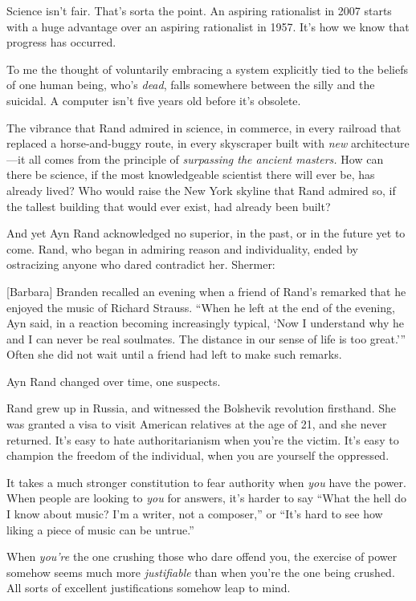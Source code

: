 {
 Science isn't fair. That's sorta
the point. An aspiring rationalist in 2007 starts with a huge advantage
over an aspiring rationalist in 1957. It's how we know
that progress has occurred.}

{
 To me the thought of voluntarily embracing a system explicitly
tied to the beliefs of one human being, who's
\textit{dead}, falls somewhere between the silly and the suicidal. A
computer isn't five years old before
it's obsolete.}

{
 The vibrance that Rand admired in science, in commerce, in every
railroad that replaced a horse-and-buggy route, in every skyscraper
built with \textit{new} architecture---it all comes from the principle
of \textit{surpassing the ancient masters.} How can there be science,
if the most knowledgeable scientist there will ever be, has already
lived? Who would raise the New York skyline that Rand admired so, if
the tallest building that would ever exist, had already been built?}

{
 And yet Ayn Rand acknowledged no superior, in the past, or in the
future yet to come. Rand, who began in admiring reason and
individuality, ended by ostracizing anyone who dared contradict her.
Shermer:}

{
 [Barbara] Branden recalled an evening when a friend of
Rand's remarked that he enjoyed the music of Richard
Strauss. ``When he left at the end of the evening, Ayn
said, in a reaction becoming increasingly typical, `Now
I understand why he and I can never be real soulmates. The distance in
our sense of life is too great.'''
Often she did not wait until a friend had left to make such remarks.}

{
 Ayn Rand changed over time, one suspects.}

{
 Rand grew up in Russia, and witnessed the Bolshevik revolution
firsthand. She was granted a visa to visit American relatives at the
age of 21, and she never returned. It's easy to hate
authoritarianism when you're the victim.
It's easy to champion the freedom of the individual,
when you are yourself the oppressed.}

{
 It takes a much stronger constitution to fear authority when
\textit{you} have the power. When people are looking to \textit{you}
for answers, it's harder to say ``What
the hell do I know about music? I'm a writer, not a
composer,'' or
``It's hard to see how liking a piece
of music can be untrue.''}

{
 When \textit{you're} the one crushing those who
dare offend you, the exercise of power somehow seems much more
\textit{justifiable} than when you're the one being
crushed. All sorts of excellent justifications somehow leap to mind.}


